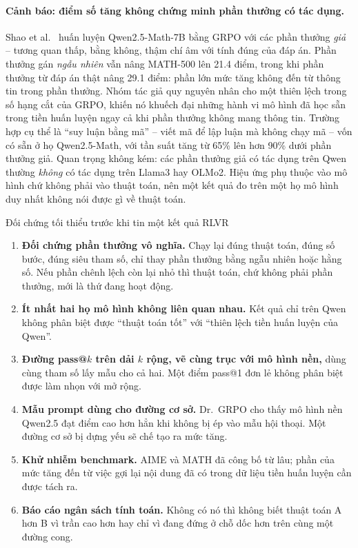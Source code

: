\paragraph{Cảnh báo: điểm số tăng không chứng minh phần thưởng có tác dụng.}
Shao et al.~\cite{shao2025spurious} huấn luyện Qwen2.5-Math-7B bằng GRPO với các phần thưởng \emph{giả} -- tương quan thấp, bằng không, thậm chí âm với tính đúng của đáp án. Phần thưởng gán \emph{ngẫu nhiên} vẫn nâng MATH-500 lên 21.4 điểm, trong khi phần thưởng từ đáp án thật nâng 29.1 điểm: phần lớn mức tăng không đến từ thông tin trong phần thưởng. Nhóm tác giả quy nguyên nhân cho một thiên lệch trong số hạng cắt của GRPO, khiến nó khuếch đại những hành vi mô hình đã học sẵn trong tiền huấn luyện ngay cả khi phần thưởng không mang thông tin. Trường hợp cụ thể là ``suy luận bằng mã'' -- viết mã để lập luận mà không chạy mã -- vốn có sẵn ở họ Qwen2.5-Math, với tần suất tăng từ 65\% lên hơn 90\% dưới phần thưởng giả. Quan trọng không kém: các phần thưởng giả có tác dụng trên Qwen thường \emph{không} có tác dụng trên Llama3 hay OLMo2. Hiệu ứng phụ thuộc vào mô hình chứ không phải vào thuật toán, nên một kết quả đo trên một họ mô hình duy nhất không nói được gì về thuật toán.

\begin{checklist}{Đối chứng tối thiểu trước khi tin một kết quả RLVR}
\begin{enumerate}
	\item \textbf{Đối chứng phần thưởng vô nghĩa.} Chạy lại đúng thuật toán, đúng số bước, đúng siêu tham số, chỉ thay phần thưởng bằng ngẫu nhiên hoặc hằng số. Nếu phần chênh lệch còn lại nhỏ thì thuật toán, chứ không phải phần thưởng, mới là thứ đang hoạt động.
	\item \textbf{Ít nhất hai họ mô hình không liên quan nhau.} Kết quả chỉ trên Qwen không phân biệt được ``thuật toán tốt'' với ``thiên lệch tiền huấn luyện của Qwen''.
	\item \textbf{Đường pass@$k$ trên dải $k$ rộng, vẽ cùng trục với mô hình nền,} dùng cùng tham số lấy mẫu cho cả hai. Một điểm pass@1 đơn lẻ không phân biệt được làm nhọn với mở rộng.
	\item \textbf{Mẫu prompt dùng cho đường cơ sở.} Dr.~GRPO cho thấy mô hình nền Qwen2.5 đạt điểm cao hơn hẳn khi không bị ép vào mẫu hội thoại. Một đường cơ sở bị dựng yếu sẽ chế tạo ra mức tăng.
	\item \textbf{Khử nhiễm benchmark.} AIME và MATH đã công bố từ lâu; phần của mức tăng đến từ việc gợi lại nội dung đã có trong dữ liệu tiền huấn luyện cần được tách ra.
	\item \textbf{Báo cáo ngân sách tính toán.} Không có nó thì không biết thuật toán A hơn B vì trần cao hơn hay chỉ vì đang đứng ở chỗ dốc hơn trên cùng một đường cong.
\end{enumerate}
\end{checklist}

